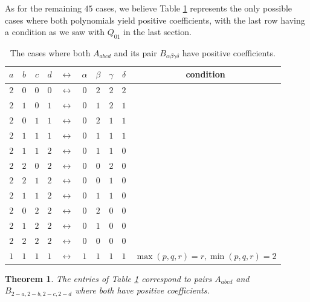 \documentclass[11pt]{amsart}
\numberwithin{equation}{section}
\theoremstyle{plain}
\newtheorem{theorem}[equation]{Theorem}
\theoremstyle{definition}
\begin{document}
 
 As for the remaining $45$ cases, we believe Table \ref{tab:pos2} represents the only possible cases where both polynomials yield positive coefficients, with the last row having a condition as we saw with $Q_{01}$ in the last section. 
 
\begin{table}[h]
\begin{center}
\begin{tabular}{|ccccccccc|c|}\hline
$a$ & $b$ & $c$ & $d$ & $\leftrightarrow$ & $\alpha$ & $\beta$ & $\gamma$ & $\delta$ & condition \\
\hline
$2$ & $0$ & $0$ & $0$ & $\leftrightarrow$ & $0$ & $2$ & $2$ & $2$ & \\
$2$ & $1$ & $0$ & $1$ & $\leftrightarrow$ & $0$ & $1$ & $2$ & $1$ & \\
$2$ & $0$ & $1$ & $1$ & $\leftrightarrow$ & $0$ & $2$ & $1$ & $1$ & \\
$2$ & $1$ & $1$ & $1$ & $\leftrightarrow$ & $0$ & $1$ & $1$ & $1$ & \\
$2$ & $1$ & $1$ & $2$ & $\leftrightarrow$ & $0$ & $1$ & $1$ & $0$ & \\
$2$ & $2$ & $0$ & $2$ & $\leftrightarrow$ & $0$ & $0$ & $2$ & $0$ & \\
$2$ & $2$ & $1$ & $2$ & $\leftrightarrow$ & $0$ & $0$ & $1$ & $0$ & \\
$2$ & $1$ & $1$ & $2$ & $\leftrightarrow$ & $0$ & $1$ & $1$ & $0$ & \\
$2$ & $0$ & $2$ & $2$ & $\leftrightarrow$ & $0$ & $2$ & $0$ & $0$ & \\
$2$ & $1$ & $2$ & $2$ & $\leftrightarrow$ & $0$ & $1$ & $0$ & $0$ & \\
$2$ & $2$ & $2$ & $2$ & $\leftrightarrow$ & $0$ & $0$ & $0$ & $0$ & \\
$1$ & $1$ & $1$ & $1$ & $\leftrightarrow$ & $1$ & $1$ & $1$ & $1$ & $\max(p,q,r)=r, \min(p,q,r)=2$ \\

\hline
\end{tabular}
\end{center}
\caption{The cases where both $A_{abcd}$ and its pair $B_{\alpha\beta\gamma\delta}$ have positive coefficients.}\label{tab:pos2}
\end{table}

\begin{theorem}\label{thm:pqr}
The entries of Table \ref{tab:pos2} correspond to pairs $A_{abcd}$ and $B_{2-a,2-b,2-c,2-d}$ where both have positive coefficients.
\end{theorem}
\end{document}
